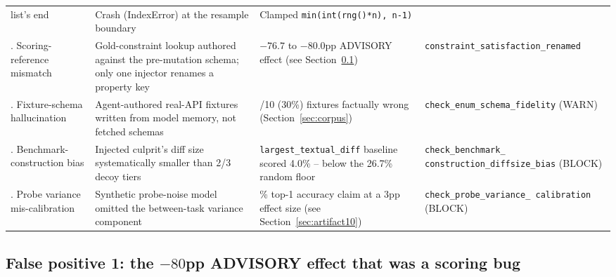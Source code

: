 \documentclass[11pt]{article}
\begin{document}
{\begin{longtable}{@{}>{\raggedright\arraybackslash}p{2.1cm}>{\raggedright\arraybackslash}p{4.4cm}>{\raggedright\arraybackslash}p{4.1cm}>{\raggedright\arraybackslash}p{3.4cm}@{}}
  list's end & Crash (IndexError) at the resample boundary & Clamped
  \texttt{min(int(rng()*n),\allowbreak\,n-1)} \\
7. Scoring-reference mismatch & Gold-constraint lookup authored against the pre-mutation schema;
  only one injector renames a property key & $-76.7$ to $-80.0$pp ADVISORY effect (see
  Section~\ref{sec:artifact7}) & \texttt{constraint\_\allowbreak satisfaction\_\allowbreak renamed} \\
8. Fixture-schema hallucination & Agent-authored real-API fixtures written from model memory, not
  fetched schemas & 3/10 (30\%) fixtures factually wrong (Section~\ref{sec:corpus}) &
  \texttt{check\_\allowbreak enum\_\allowbreak schema\_\allowbreak fidelity} (WARN) \\
9. Benchmark-construction bias & Injected culprit's diff size systematically smaller than 2/3
  decoy tiers & \texttt{largest\_\allowbreak textual\_\allowbreak diff} baseline scored 4.0\% --
  below the 26.7\% random floor & \texttt{check\_\allowbreak benchmark\_\allowbreak
  construction\_\allowbreak diffsize\_\allowbreak bias} (BLOCK) \\
10. Probe variance mis-calibration & Synthetic probe-noise model omitted the between-task variance
  component & 100\% top-1 accuracy claim at a 3pp effect size (see
  Section~\ref{sec:artifact10}) & \texttt{check\_\allowbreak probe\_\allowbreak variance\_\allowbreak
  calibration} (BLOCK) \\
\bottomrule
\end{longtable}
}

\subsection{False positive 1: the $-80$pp ADVISORY effect that was a scoring bug}
\label{sec:artifact7}
\end{document}
